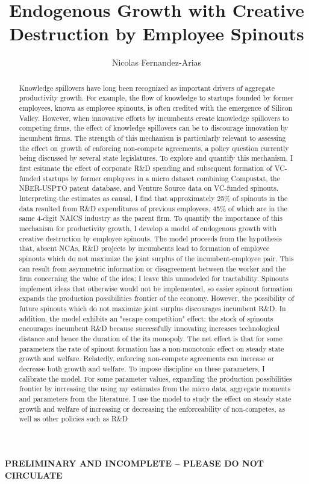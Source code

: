 \documentclass[12pt,english]{article}
\theoremstyle{remark}
\begin{document}
	
\title{Endogenous Growth with Creative Destruction by Employee Spinouts}
\author{Nicolas Fernandez-Arias}
\maketitle


\textbf{PRELIMINARY AND INCOMPLETE -- PLEASE DO NOT CIRCULATE}

\begin{abstract}
	Knowledge spillovers have long been recognized as important drivers of aggregate productivity growth. For example, the flow of knowledge to startups founded by former employees, known as employee spinouts, is often credited with the emergence of Silicon Valley. However, when innovative efforts by incumbents create knowledge spillovers to competing firms, the effect of knowledge spillovers can be to discourage innovation by incumbent firms. The strength of this mechanism is particularly relevant to assessing the effect on growth of enforcing non-compete agreements, a policy question currently being discussed by several state legislatures. To explore and quantify this mechanism, I first esitmate the effect of corporate R\&D spending and subsequent formation of VC-funded startups by former employees in a micro dataset combining Compustat, the NBER-USPTO patent database, and Venture Source data on VC-funded spinouts. Interpreting the estimates as causal, I find that approximately 25\% of spinouts in the data resulted from R\&D expenditures of previous employees, 45\% of which are in the same 4-digit NAICS industry as the parent firm. To quantify the importance of this mechanism for productivity growth, I develop a model of endogenous growth with creative destruction by employee spinouts. The model proceeds from the hypothesis that, absent NCAs, R\&D projects by incumbents lead to formation of employee spinouts which do not maximize the joint surplus of the incumbent-employee pair. This can result from asymmetric information or disagreement between the worker and the firm concerning the value of the idea; I leave this unmodeled for tractability. Spinouts implement ideas that otherwise would not be implemented, so easier spinout formation expands the production possibilities frontier of the economy. However, the possibility of future spinouts which do not maximize joint surplus discourages incumbent R\&D. In addition, the model exhibits an "escape competition" effect: the stock of spinouts encourages incumbent R\&D because successfully innovating increases technological distance and hence the duration of the its monopoly. The net effect is that for some parameters the rate of spinout formation has a non-monotonic effect on steady state growth and welfare. Relatedly, enforcing non-compete agreements can increase or decrease both growth and welfare. To impose discipline on these parameters, I calibrate the model. For some parameter values, expanding the production possibilities frontier by increasing the using my estimates from the micro data, aggregate moments and parameters from the literature. I use the model to study the effect on steady state growth and welfare of increasing or decreasing the enforceability of non-competes, as well as other policies such as R\&D 
\end{abstract}
\end{document}
